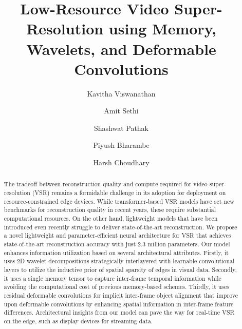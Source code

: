 \documentclass[11pt]{article}
\title{Low-Resource Video Super-Resolution using Memory, Wavelets, and Deformable Convolutions}
\author[1]{Kavitha Viswanathan}
\author[1]{Amit Sethi}
\author[1]{Shashwat Pathak}
\author[1]{Piyush Bharambe}
\author[1]{Harsh Choudhary}
\affil[1]{Department of Electrical Engineering, IIT Bombay, India}
\begin{document}
\maketitle

\begin{abstract}
The tradeoff between reconstruction quality and compute required for video super-resolution (VSR) remains a formidable challenge in its adoption for deployment on resource-constrained edge devices. While transformer-based VSR models have set new benchmarks for reconstruction quality in recent years, these require substantial computational resources. On the other hand, lightweight models that have been introduced even recently struggle to deliver state-of-the-art reconstruction. We propose a novel lightweight and parameter-efficient neural architecture for VSR that achieves state-of-the-art reconstruction accuracy with just 2.3 million parameters. Our model enhances information utilization based on several architectural attributes. Firstly, it uses 2D wavelet decompositions  strategically interlayered with learnable convolutional layers to utilize the inductive prior of spatial sparsity of edges in visual data. Secondly, it uses a single memory tensor to capture inter-frame temporal information while avoiding the computational cost of previous memory-based schemes. Thirdly, it uses residual deformable convolutions for implicit inter-frame object alignment that improve upon deformable convolutions by enhancing spatial information in inter-frame feature differences. Architectural insights from our model can pave the way for real-time VSR on the edge, such as display devices for streaming data.
\end{abstract}
\end{document}
